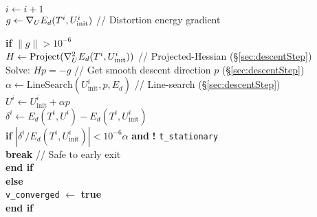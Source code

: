 \begin{algorithm}[t]
\hspace{20pt}  $i \leftarrow i+1$ \\
\hspace{20pt}  $g \leftarrow \nabla_{\small{U}} E_{d}(T^i,U^i_\text{init})$ \hspace{10pt}//  Distortion energy gradient 

\hspace{20pt}\textbf{if} $\|g\| > 10^{-6}$ \hspace{2pt} \\

\hspace{30pt} $H \leftarrow \text{Project}(\nabla_{\small{U}}^2 E_d(T^i,U^{i}_\text{init}))$ \hspace{10pt}// Projected-Hessian (\S\ref{sec:descentStep}) \\

\hspace{30pt} Solve: $H p = -g$ \hspace{10pt} // Get smooth descent direction $p$ (\S\ref{sec:descentStep}) \\

\hspace{30pt} $\alpha \leftarrow \text{LineSearch}(U^{i}_\text{init}, p, E_d)$ \hspace{10pt} // Line-search (\S\ref{sec:descentStep}) \\

\hspace{30pt} $U^{i} \leftarrow U^i_\text{init} + \alpha p$  \\
		
\hspace{30pt} $\delta^{i} \leftarrow E_{d}(T^i,U^{i}) - E_{d}(T^i,U^i_\text{init})$  \\

\hspace{30pt}\textbf{if} $|\delta^{i}/E_{d}(T^i,U^i_\text{init})| < 10^{-6}\alpha$ \textbf{and} \textbf{!}  \texttt{t\_stationary} \\
\hspace{40pt} \textbf{break} \hspace{10pt} // Safe to early exit \\
\hspace{30pt} \textbf{end if} \\

\hspace{20pt} \textbf{else}  \\
\hspace{30pt} \texttt{v\_converged} $\leftarrow $ \textbf{true} \\
\hspace{20pt} \textbf{end if} \\


\end{algorithm}
